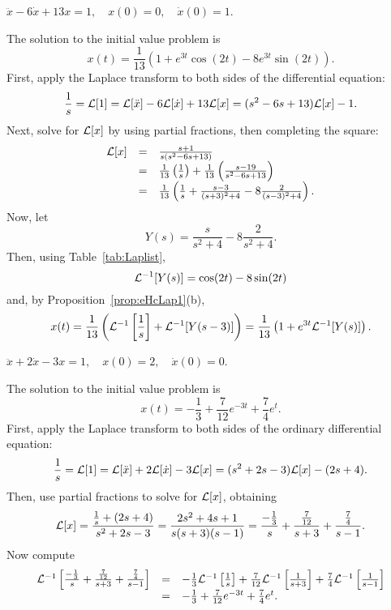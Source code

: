 \documentclass{ximera}
\begin{document}
\begin{exercise} \label{c13.4.3b}
$\ddot x -6\dot x +13 x=1,\quad x(0)=0,\quad \dot{x}(0)=1$.

\begin{solution}
\ans The solution to the initial value problem is
\[
x(t) = \frac{1}{13}\left(1 + e^{3t}\cos(2t) - 8e^{3t}\sin(2t)\right).
\]
\soln First, apply the Laplace transform to both sides of the differential
equation:
\[
\frac{1}{s} = {\cal L}[1]
= {\cal L}[\ddot{x}] - 6{\cal L}[\dot{x}] + 13{\cal L}[x]
= (s^2 - 6s + 13){\cal L}[x] - 1.
\]
Next, solve for ${\cal L}[x]$ by using partial fractions, then completing
the square:
\[
\begin{array}{rcl}
{\cal L}[x] & = & \frac{s + 1}{s(s^2 - 6s + 13)} \\
& = & \frac{1}{13}\left(\frac{1}{s}\right) +
\frac{1}{13}\left(\frac{s - 19}{s^2 - 6s + 13}\right) \\
& = & \frac{1}{13}\left(\frac{1}{s} +
\frac{s - 3}{(s + 3)^2 + 4} - 8\frac{2}{(s - 3)^2 + 4}\right).
\end{array}
\]
Now, let
\[
Y(s) = \frac{s}{s^2 + 4} - 8\frac{2}{s^2 + 4}.
\]
Then, using Table~\ref{tab:Laplist},
\[
{\cal L}^{-1}[Y(s)] = \cos(2t) - 8\sin(2t)
\]
and, by Proposition~\ref{prop:eHcLap1}(b),
\[
x(t) = \frac{1}{13}\left({\cal L}^{-1}\left[\frac{1}{s}\right] +
{\cal L}^{-1}[Y(s - 3)]\right) =
\frac{1}{13}\left(1 + e^{3t}{\cal L}^{-1}[Y(s)]\right).
\]



\end{solution}
\end{exercise}
\begin{exercise} \label{c13.2.1}
$\ddot{x} + 2\dot{x} - 3x  =  1, \quad x(0) = 2, \quad \dot{x}(0) = 0$.

\begin{solution}
\ans The solution to the initial value problem is
\[
x(t) = -\frac{1}{3} + \frac{7}{12}e^{-3t} + \frac{7}{4}e^t.
\]
\soln First, apply the Laplace transform to both sides of the ordinary
differential equation:
\[
\frac{1}{s} = {\cal L}[1]
= {\cal L}[\ddot{x}] + 2{\cal L}[\dot{x}] - 3{\cal L}[x]
= (s^2 + 2s - 3){\cal L}[x] - (2s + 4).
\]
Then, use partial fractions to solve for ${\cal L}[x]$, obtaining
\[
{\cal L}[x] = \frac{\frac{1}{s} + (2s + 4)}{s^2 + 2s - 3}
= \frac{2s^2 + 4s + 1}{s(s + 3)(s - 1)}
= \frac{-\frac{1}{3}}{s} + \frac{\frac{7}{12}}{s + 3}
+ \frac{\frac{7}{4}}{s - 1}.
\]
Now compute
\[
\begin{array}{rcl}
{\cal L}^{-1}\left[\frac{-\frac{1}{3}}{s} + \frac{\frac{7}{12}}{s + 3}
+ \frac{\frac{7}{4}}{s - 1}\right]
& = & -\frac{1}{3}{\cal L}^{-1}\left[\frac{1}{s}\right]
+ \frac{7}{12}{\cal L}^{-1}\left[\frac{1}{s + 3}\right]
+ \frac{7}{4}{\cal L}^{-1}\left[\frac{1}{s - 1}\right] \\
& = & -\frac{1}{3} + \frac{7}{12}e^{-3t} + \frac{7}{4}e^t.
\end{array}
\]

\end{solution}
\end{exercise}
\end{document}
